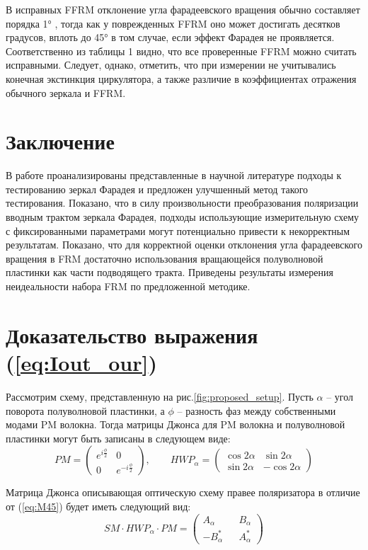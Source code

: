 \documentclass{article}
\begin{document}
В исправных FFRM отклонение угла фарадеевского вращения обычно составляет порядка 1° \autocite{paschottaFaradayMirrors2022}, тогда как у поврежденных FFRM оно может достигать десятков градусов, вплоть до 45° в том случае, если эффект Фарадея не проявляется.
Соответственно из таблицы 1 видно, что все проверенные FFRM можно считать исправными.
Следует, однако, отметить, что при измерении не учитывались конечная экстинкция циркулятора, а также различие в коэффициентах отражения обычного зеркала и FFRM.

\section{Заключение}
В работе проанализированы представленные в научной литературе подходы к тестированию зеркал Фарадея и предложен улучшенный метод такого тестирования.
Показано, что в силу произвольности преобразования поляризации вводным трактом зеркала Фарадея, подходы использующие измерительную схему с фиксированными параметрами могут потенциально привести к некорректным результатам.
Показано, что для корректной оценки отклонения угла фарадеевского вращения в FRM достаточно использования вращающейся полуволновой пластинки как части подводящего тракта.
Приведены результаты измерения неидеальности набора FRM по предложенной методике.

\appendix
{}
\section{Доказательство выражения (\ref{eq:Iout_our})}
Рассмотрим схему, представленную на рис.\ref{fig:proposed_setup}.
Пусть $\alpha$ – угол поворота полуволновой пластинки, а $\phi$ – разность фаз между собственными модами PM волокна.
Тогда матрицы Джонса для PM волокна и полуволновой пластинки могут быть записаны в следующем виде:
\begin{equation}
	PM = 
	\begin{pmatrix}
		e^{i\frac{\phi}{2}} & 0 \\
		0 & e^{-i\frac{\phi}{2}}
	\end{pmatrix},\qquad 
	HWP_\alpha = 
	\begin{pmatrix}
		\cos 2 \alpha & \sin 2 \alpha \\
		\sin 2 \alpha & -\cos 2 \alpha
	\end{pmatrix}
\end{equation}

Матрица Джонса описывающая оптическую схему правее поляризатора в отличие от (\ref{eq:M45}) будет иметь следующий вид:
\begin{equation}
	SM \cdot HWP_\alpha \cdot PM =
	\begin{pmatrix} 
		A_\alpha 	&& 	B_\alpha \\
		-B_\alpha^* && 	A_\alpha^*
	\end{pmatrix}
\end{equation}
\end{document}
